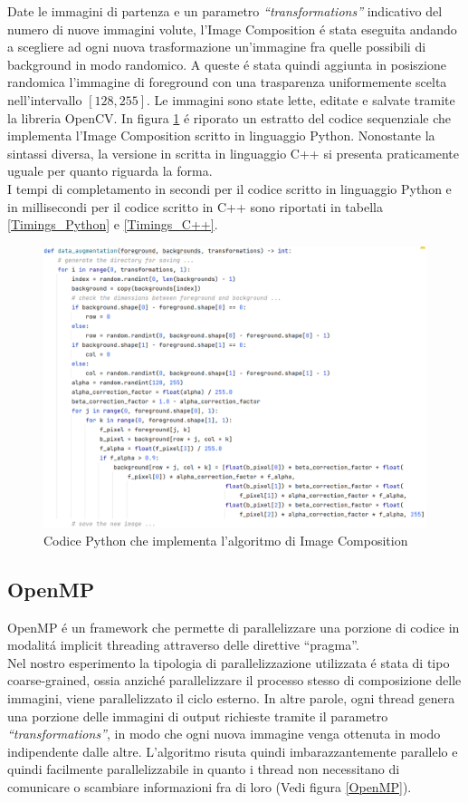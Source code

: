 \documentclass{article}
\begin{document}
Date le immagini di partenza e un parametro \textit{“transformations”} indicativo del numero di nuove immagini volute, l'Image Composition \'e stata eseguita andando a scegliere ad ogni nuova trasformazione un'immagine fra quelle possibili di background in modo randomico. A queste \'e stata quindi aggiunta in posiszione randomica l'immagine di foreground con una trasparenza uniformemente scelta nell'intervallo $ [128,255] $. Le immagini sono state lette, editate e salvate tramite la libreria OpenCV. In figura \ref{Sequential} \'e riporato un estratto del codice sequenziale che implementa l'Image Composition scritto in linguaggio Python. Nonostante la sintassi diversa, la versione in scritta in linguaggio C++ si presenta praticamente uguale per quanto riguarda la forma.\\
I tempi di completamento in secondi per il codice scritto in linguaggio Python e in millisecondi per il codice scritto in C++ sono riportati in tabella \ref{Timings_Python} e \ref{Timings_C++}. 

\begin{figure}[!h]
\centering
\includegraphics[width= 13cm]{"Immagini/Sequential.PNG"}
\caption{Codice Python che implementa l'algoritmo di Image Composition}
\label{Sequential}
\end{figure}

\newpage


\subsection{OpenMP}
OpenMP \'e un framework che permette di parallelizzare una porzione di codice in modalit\'a implicit threading attraverso delle direttive “pragma”.\\
Nel nostro esperimento la tipologia di parallelizzazione utilizzata \'e stata di tipo coarse-grained, ossia anzich\'e parallelizzare il processo stesso di composizione delle immagini, viene parallelizzato il ciclo esterno. In altre parole, ogni thread genera una porzione delle immagini di output richieste tramite il parametro \textit{“transformations”}, in modo che ogni nuova immagine venga ottenuta in modo indipendente dalle altre. L'algoritmo risuta quindi imbarazzantemente parallelo e quindi facilmente parallelizzabile in quanto i thread non necessitano di comunicare o scambiare informazioni fra di loro (Vedi figura \ref{OpenMP}).
\end{document}
